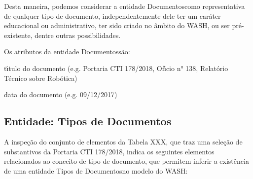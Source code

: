 \documentclass[
12pt,		%
openright,	%
twoside,  %
a4paper,			%
chapter=TITLE,		%
english,			%
french,				%
spanish,			%
brazil				%
]{USPSC-classe/USPSC}
\begin{document}
Desta maneira, podemos considerar a entidade \textquotedbl Documentos\textquotedbl  como representativa de qualquer tipo de documento, independentemente dele ter um car\'ater educacional ou administrativo, ter sido criado no \^ambito do WASH, ou ser pr\'e-existente, dentre outras possibilidades.














Os atributos da entidade \textquotedbl Documentos\textquotedbl  s\~ao:















\begin{alineas}
\item t\'{\i}tulo do documento (e.g. \textquotedbl Portaria CTI 178/2018\textquotedbl , \textquotedbl Of\'{\i}cio n° 138\textquotedbl , \textquotedbl Relat\'orio T\'ecnico sobre Rob\'otica\textquotedbl )
\item data do documento (e.g. 09/12/2017)
\end{alineas}

\subsection[Entidade: Tipos de Documentos]{Entidade: Tipos de Documentos}\label{Entidade: Tipos de Documentos}
A inspe\c{c}\~ao do conjunto de elementos da Tabela XXX, que traz uma sele\c{c}\~ao de substantivos da Portaria CTI 178/2018, indica os seguintes elementos relacionados ao conceito de \textquotedbl tipo de documento\textquotedbl , que permitem inferir a exist\^encia de uma entidade \textquotedbl Tipos de Documentos\textquotedbl  no modelo do WASH:















\noindent\begin{center}\mbox{\centering{}}\end{center}
\end{document}
